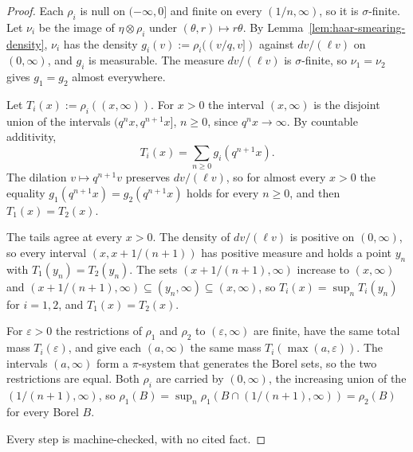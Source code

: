 \begin{proof}
\leanok
{}
Each $\rho_i$ is null on $(-\infty,0]$ and finite on every $(1/n,\infty)$, so it is
$\sigma$-finite. Let $\nu_i$ be the image of $\eta \otimes \rho_i$ under
$(\theta, r) \mapsto r\theta$. By Lemma~\ref{lem:haar-smearing-density}, $\nu_i$ has the density
$g_i(v) := \rho_i((v/q,v])$ against $dv/(\ell v)$ on $(0,\infty)$, and $g_i$ is measurable. The measure $dv/(\ell v)$ is $\sigma$-finite, so $\nu_1 = \nu_2$ gives
$g_1 = g_2$ almost everywhere.

Let $T_i(x) := \rho_i((x,\infty))$. For $x > 0$ the interval $(x,\infty)$ is the disjoint union
of the intervals $(q^nx, q^{n+1}x]$, $n \ge 0$, since $q^nx \to \infty$. By countable additivity,
\[
  T_i(x) = \sum_{n \ge 0} g_i(q^{n+1}x).
\]
The dilation $v \mapsto q^{n+1}v$ preserves $dv/(\ell v)$, so for almost every $x > 0$ the equality
$g_1(q^{n+1}x) = g_2(q^{n+1}x)$ holds for every $n \ge 0$, and then $T_1(x) = T_2(x)$.

The tails agree at every $x > 0$. The density of $dv/(\ell v)$ is positive on $(0,\infty)$, so
every interval $(x, x + 1/(n+1))$ has positive measure and holds a point $y_n$ with
$T_1(y_n) = T_2(y_n)$. The sets $(x + 1/(n+1), \infty)$ increase to $(x,\infty)$ and
$(x + 1/(n+1), \infty) \subseteq (y_n,\infty) \subseteq (x,\infty)$, so
$T_i(x) = \sup_n T_i(y_n)$ for $i = 1, 2$, and $T_1(x) = T_2(x)$.

For $\varepsilon > 0$ the restrictions of $\rho_1$ and $\rho_2$ to $(\varepsilon,\infty)$ are
finite, have the same total mass $T_i(\varepsilon)$, and give each $(a,\infty)$ the same mass
$T_i(\max(a,\varepsilon))$. The intervals $(a,\infty)$ form a $\pi$-system that generates the Borel
sets, so the two restrictions are equal. Both $\rho_i$ are carried by $(0,\infty)$, the increasing
union of the $(1/(n+1),\infty)$, so
$\rho_1(B) = \sup_n\rho_1(B \cap (1/(n+1),\infty)) = \rho_2(B)$ for every Borel $B$.

Every step is machine-checked, with no cited fact.
\end{proof}

